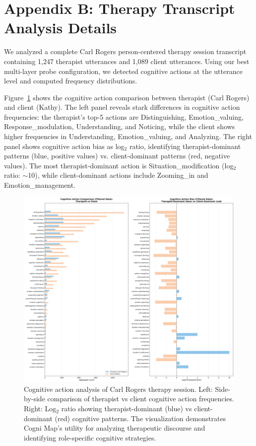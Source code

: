 \documentclass[letterpaper]{article}
\begin{document}
\section{Appendix B: Therapy Transcript Analysis Details}

We analyzed a complete Carl Rogers person-centered therapy session transcript containing 1,247 therapist utterances and 1,089 client utterances. Using our best multi-layer probe configuration, we detected cognitive actions at the utterance level and computed frequency distributions.

Figure~\ref{fig:therapy_viz} shows the cognitive action comparison between therapist (Carl Rogers) and client (Kathy). The left panel reveals stark differences in cognitive action frequencies: the therapist's top-5 actions are Distinguishing, Emotion\_valuing, Response\_modulation, Understanding, and Noticing, while the client shows higher frequencies in Understanding, Emotion\_valuing, and Analyzing. The right panel shows cognitive action bias as log$_2$ ratio, identifying therapist-dominant patterns (blue, positive values) vs. client-dominant patterns (red, negative values). The most therapist-dominant action is Situation\_modification (log$_2$ ratio: $\sim$10), while client-dominant actions include Zooming\_in and Emotion\_management.

\begin{figure}[t]
\centering
\includegraphics[width=\textwidth]{../Keep_viz/rogers_kathy_comparison.png}
\caption{Cognitive action analysis of Carl Rogers therapy session. Left: Side-by-side comparison of therapist vs client cognitive action frequencies. Right: Log$_2$ ratio showing therapist-dominant (blue) vs client-dominant (red) cognitive patterns. The visualization demonstrates Cogni Map's utility for analyzing therapeutic discourse and identifying role-specific cognitive strategies.}
\label{fig:therapy_viz}
\end{figure}
\end{document}
